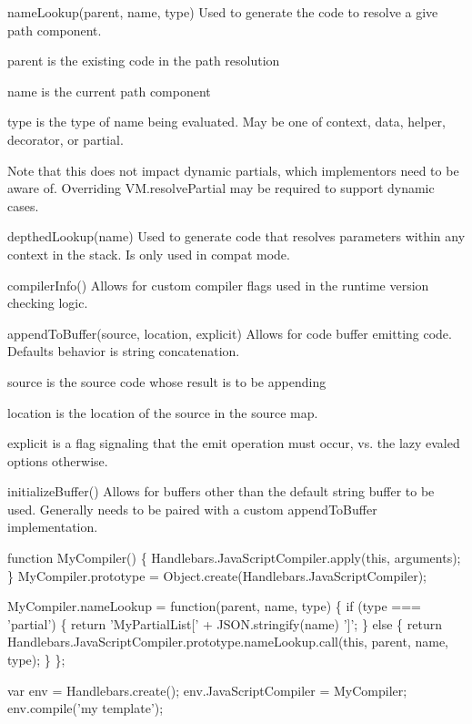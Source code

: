 \begin{DoxyItemize}
\item {\ttfamily name\+Lookup(parent, name, type)} Used to generate the code to resolve a give path component.
\begin{DoxyItemize}
\item {\ttfamily parent} is the existing code in the path resolution
\item {\ttfamily name} is the current path component
\item {\ttfamily type} is the type of name being evaluated. May be one of {\ttfamily context}, {\ttfamily data}, {\ttfamily helper}, {\ttfamily decorator}, or {\ttfamily partial}.
\end{DoxyItemize}

Note that this does not impact dynamic partials, which implementors need to be aware of. Overriding {\ttfamily V\+M.\+resolve\+Partial} may be required to support dynamic cases.
\item {\ttfamily depthed\+Lookup(name)} Used to generate code that resolves parameters within any context in the stack. Is only used in {\ttfamily compat} mode.
\item {\ttfamily compiler\+Info()} Allows for custom compiler flags used in the runtime version checking logic.
\item {\ttfamily append\+To\+Buffer(source, location, explicit)} Allows for code buffer emitting code. Defaults behavior is string concatenation.
\begin{DoxyItemize}
\item {\ttfamily source} is the source code whose result is to be appending
\item {\ttfamily location} is the location of the source in the source map.
\item {\ttfamily explicit} is a flag signaling that the emit operation must occur, vs. the lazy evaled options otherwise.
\end{DoxyItemize}
\item {\ttfamily initialize\+Buffer()} Allows for buffers other than the default string buffer to be used. Generally needs to be paired with a custom {\ttfamily append\+To\+Buffer} implementation.
\end{DoxyItemize}


\begin{DoxyCode}
function MyCompiler() \{
  Handlebars.JavaScriptCompiler.apply(this, arguments);
\}
MyCompiler.prototype = Object.create(Handlebars.JavaScriptCompiler);

MyCompiler.nameLookup = function(parent, name, type) \{
  if (type === 'partial') \{
    return 'MyPartialList[' + JSON.stringify(name) ']';
  \} else \{
    return Handlebars.JavaScriptCompiler.prototype.nameLookup.call(this, parent, name, type);
  \}
\};

var env = Handlebars.create();
env.JavaScriptCompiler = MyCompiler;
env.compile('my template');
\end{DoxyCode}
 